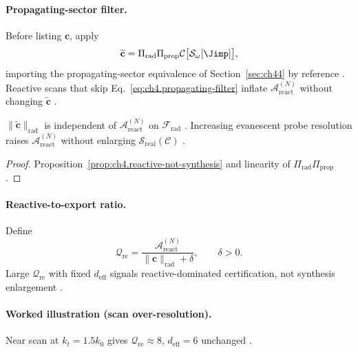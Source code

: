 
\paragraph{Propagating-sector filter.}
Before listing \(\mathbf{c}\), apply
\begin{equation}
\label{eq:ch4.propagating-filter}
\widetilde{\mathbf{c}}=\Pi_{\mathrm{rad}}\Pi_{\mathrm{prop}}\mathcal{C}\big[\mathcal{S}_\omega[\Jimp]\big],
\end{equation}
importing the propagating-sector equivalence of Section~\ref{sec:ch44} by reference \cite{stratton1941,harrington2001}. Reactive scans that skip
Eq.~\eqref{eq:ch4.propagating-filter} inflate \(\mathcal{A}_{\mathrm{react}}^{(N)}\) without changing \(\widetilde{\mathbf{c}}\)
\cite{devaney2004,hansen1988}.

\begin{theorem}
\label{thm:ch4.ev-invisible-export}
\(\|\widetilde{\mathbf{c}}\|_{\mathrm{rad}}\) is independent of \(\mathcal{A}_{\mathrm{react}}^{(N)}\) on \(\mathcal{F}_{\mathrm{rad}}\)
\cite{stratton1941,harrington2001,devaney2004}. Increasing evanescent probe resolution raises \(\mathcal{A}_{\mathrm{react}}^{(N)}\) without
enlarging \(\mathcal{S}_{\mathrm{real}}(\mathcal{C})\) \cite{hansen1988}.
\end{theorem}
\begin{proof}
Proposition~\ref{prop:ch4.reactive-not-synthesis} and linearity of \(\Pi_{\mathrm{rad}}\Pi_{\mathrm{prop}}\) \cite{stratton1941,harrington2001}.
\end{proof}

\paragraph{Reactive-to-export ratio.}
Define
\begin{equation}
\label{eq:ch4.react-export-ratio}
\mathcal{Q}_{\mathrm{re}}=\frac{\mathcal{A}_{\mathrm{react}}^{(N)}}{\|\mathbf{c}\|_{\mathrm{rad}}+\delta},\qquad \delta>0.
\end{equation}
Large \(\mathcal{Q}_{\mathrm{re}}\) with fixed \(d_{\mathrm{eff}}\) signals reactive-dominated certification, not synthesis enlargement
\cite{harrington2001,devaney2004,hansen1988,jackson1999}.

\paragraph{Worked illustration (scan over-resolution).}
Near scan at \(k_{t}=1.5k_{0}\) gives \(\mathcal{Q}_{\mathrm{re}}\approx8\), \(d_{\mathrm{eff}}=6\) unchanged \cite{harrington2001,jackson1999,hansen1988}.


